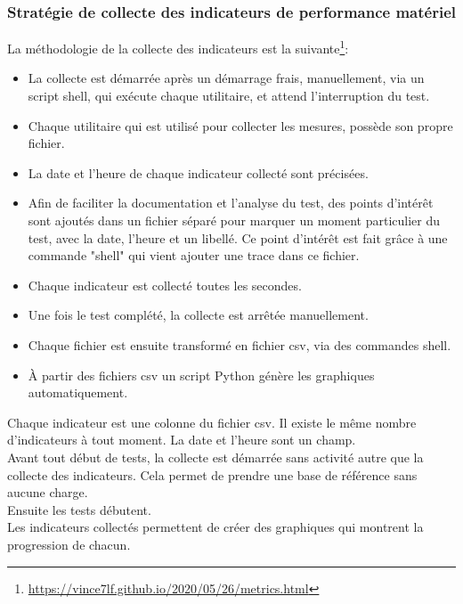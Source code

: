 \subsubsection{Stratégie de collecte des indicateurs de performance matériel}
\noindent La méthodologie de la collecte des indicateurs est la suivante\footnote{\url{https://vince7lf.github.io/2020/05/26/metrics.html}}: 
\begin{itemize}
    \item La collecte est démarrée après un démarrage frais, manuellement, via un script shell, qui exécute chaque utilitaire, et attend l'interruption du test.
    \item Chaque utilitaire qui est utilisé pour collecter les mesures, possède son propre fichier.
    \item La date et l'heure de chaque indicateur collecté sont précisées.
    \item Afin de faciliter la documentation et l'analyse du test, des points d'intérêt sont ajoutés dans un fichier séparé pour marquer un moment particulier du test, avec la date, l'heure et un libellé. Ce point d'intérêt est fait grâce à une commande "shell" qui vient ajouter une trace dans ce fichier.
    \item Chaque indicateur est collecté toutes les secondes.
    \item Une fois le test complété, la collecte est arrêtée manuellement. 
    \item Chaque fichier est ensuite transformé en fichier \acrshort{csv}, via des commandes shell.
    \item À partir des fichiers \acrshort{csv} un script Python génère les graphiques automatiquement. 
\end{itemize}
\vspace{0.5\baselineskip}
\noindent Chaque indicateur est une colonne du fichier \acrshort{csv}. Il existe le même nombre d'indicateurs à tout moment. La date et l'heure sont un champ. 
\vspace{0.5\baselineskip}
\\
\noindent Avant tout début de tests, la collecte est démarrée sans activité autre que la collecte des indicateurs. Cela permet de prendre une base de référence sans aucune charge.
\vspace{0.5\baselineskip}
\\
\noindent Ensuite les tests débutent. 
\vspace{0.5\baselineskip}
\\
\noindent Les indicateurs collectés permettent de créer des graphiques qui montrent la progression de chacun.
